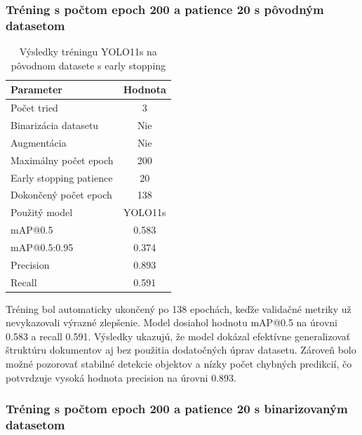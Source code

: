                 \subsubsection{Tréning s počtom epoch 200 a patience 20 s pôvodným datasetom}

                \begin{table}[H]
                    \centering
                    \begin{tabular}{|l|c|}
                    \hline
                    \textbf{Parameter} & \textbf{Hodnota} \\ \hline
                    Počet tried & 3 \\ \hline
                    Binarizácia datasetu & Nie \\ \hline
                    Augmentácia & Nie \\ \hline
                    Maximálny počet epoch & 200 \\ \hline
                    Early stopping patience & 20 \\ \hline
                    Dokončený počet epoch & 138 \\ \hline
                    Použitý model & YOLO11s \\ \hline
                    mAP@0.5 & 0.583 \\ \hline
                    mAP@0.5:0.95 & 0.374 \\ \hline
                    Precision & 0.893 \\ \hline
                    Recall & 0.591 \\ \hline
                    \end{tabular}
                    \caption{Výsledky tréningu YOLO11s na pôvodnom datasete s early stopping}
                    \label{tab:yolo11s_default_earlystop_20p}
                \end{table}

                Tréning bol automaticky ukončený po 138 epochách, keďže validačné metriky už nevykazovali výrazné zlepšenie. Model dosiahol hodnotu mAP@0.5 na úrovni 0.583 a recall 0.591. Výsledky ukazujú, že model dokázal efektívne generalizovať štruktúru dokumentov aj bez použitia dodatočných úprav datasetu. Zároveň bolo možné pozorovať stabilné detekcie objektov a nízky počet chybných predikcií, čo potvrdzuje vysoká hodnota precision na úrovni 0.893.

                \subsubsection{Tréning s počtom epoch 200 a patience 20 s binarizovaným datasetom}

